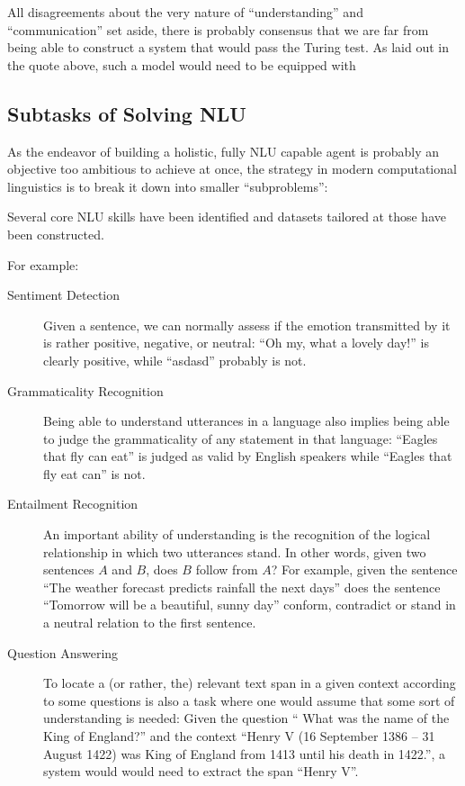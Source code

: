 All disagreements about the very nature of ``understanding'' and ``communication'' set aside,
there is probably consensus that we are far from being able to construct a system that
would pass the Turing test.
As laid out in the quote above, such a model would need
to be equipped with



\subsection{Subtasks of Solving NLU}

As the endeavor of building a holistic, fully NLU capable agent is probably an objective too
ambitious to achieve at once, the strategy in modern computational linguistics is to break it
down into smaller ``subproblems'':

Several core NLU {\color{red} skills} have been identified and datasets tailored at those
have been constructed.

For example:

\begin{description}
  \item[Sentiment Detection] Given a sentence, we can normally assess if the emotion transmitted by
      it is rather positive, negative, or neutral: ``Oh my, what a lovely day!'' is clearly positive,
      while  ``asdasd'' probably is not.
  \item[Grammaticality Recognition] Being able to understand utterances in a language also implies
      being able to judge the grammaticality of any statement in that language: ``Eagles that fly can
      eat'' is judged as valid by English speakers while ``Eagles that fly eat can'' is not.
  \item[Entailment Recognition] An important ability of understanding is the recognition of the
      logical relationship in which two utterances stand. In other words, given two sentences $A$ and
      $B$, does $B$ follow from $A$? For example, given the sentence ``The weather forecast predicts
      rainfall the next days'' does the sentence ``Tomorrow will be a beautiful, sunny day'' conform,
      contradict or stand in a neutral relation to the first sentence.
  \item[Question Answering] To locate a (or rather, the) relevant text span in a given context according to some
      questions is also a task where one would assume that some sort of understanding is needed:
      Given the question `` What was the name of the King of England?'' and the context ``Henry
      V (16 September 1386 – 31 August 1422) was King of England from 1413 until his death in
      1422.'', a system would would need to extract the span ``Henry V''.
\end{description}

